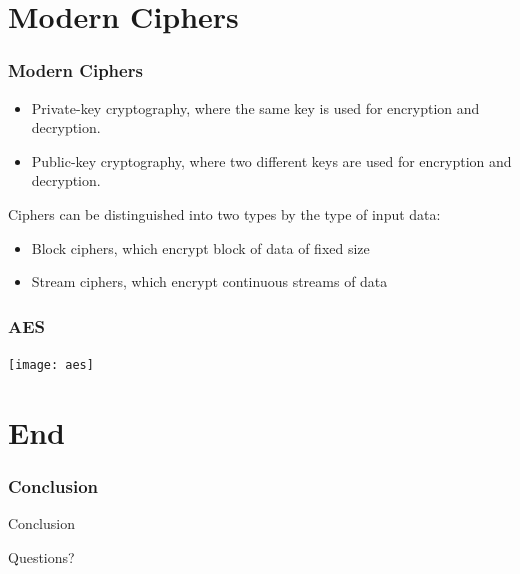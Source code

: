 \documentclass{uva-inf-presentation}
\begin{document}
\section{Modern Ciphers}
\frame{\tableofcontents[currentsection]}
\begin{frame}
\frametitle{Modern Ciphers}

\begin{itemize}
    \item Private-key cryptography, where the same key is used for encryption
        and decryption.
    \item Public-key cryptography, where two different keys are used for
        encryption and decryption.
\end{itemize}
Ciphers can be distinguished into two types by the type of input data:
\begin{itemize}
    \item Block ciphers, which encrypt block of data of fixed size
    \item Stream ciphers, which encrypt continuous streams of data
\end{itemize}
\end{frame}

\begin{frame}
\frametitle{AES}
\texttt{[image: aes]}
\end{frame}
\section{End}
\begin{frame}
\frametitle{Conclusion}
\Large{\centerline{Conclusion}}
\end{frame}

\begin{frame}
\Large{\centerline{Questions?}}
\end{frame}
\end{document}
